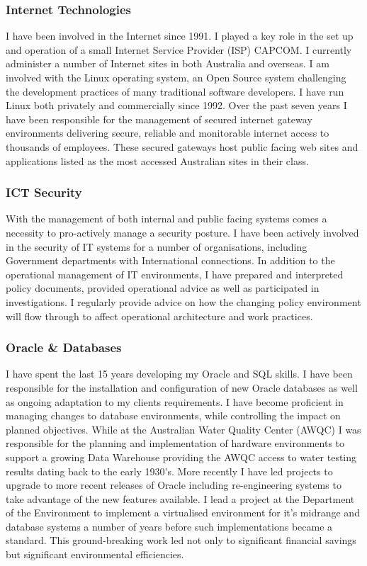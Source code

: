 \documentclass[]{friggeri-cv} %
\begin{document}
\subsubsection*{Internet Technologies}
I have been involved in the Internet since 1991. I played a key role in the set up and operation of a small Internet Service Provider (ISP) CAPCOM. I currently administer a number of Internet sites in both Australia and overseas. I am involved with the Linux operating system, an Open Source system challenging the development practices of many traditional software developers. I have run Linux both privately and commercially since 1992. Over the past seven years I have been responsible for the management of secured internet gateway environments delivering secure, reliable and monitorable internet access to thousands of employees. These secured gateways host public facing web sites and applications listed as the most accessed Australian sites in their class.

\subsubsection*{ICT Security}
With the management of both internal and public facing systems comes a necessity to pro-actively manage a security posture. I have been actively involved in the security of IT systems for a number of organisations, including Government departments with International connections. In addition to the operational management of IT environments, I have prepared and interpreted policy documents, provided operational advice as well as participated in investigations. I regularly provide advice on how the changing policy environment will flow through to affect operational architecture and work practices.

\subsubsection*{Oracle \& Databases}
I have spent the last 15 years developing my Oracle and SQL skills. I have been responsible for the installation and configuration of new Oracle databases as well as ongoing adaptation to my clients requirements. I have become proficient in managing changes to database environments, while controlling the impact on planned objectives. While at the Australian Water Quality Center (AWQC) I was responsible for the planning and implementation of hardware environments to support a growing Data Warehouse providing the AWQC access to water testing results dating back to the early 1930’s. More recently I have led projects to upgrade to more recent releases of Oracle including re-engineering systems to take advantage of the new features available. I lead a project at the Department of the Environment to implement a virtualised environment for it's midrange and database systems a number of years before such implementations became a standard. This ground-breaking work led not only to significant financial savings but significant environmental efficiencies.
\end{document}
